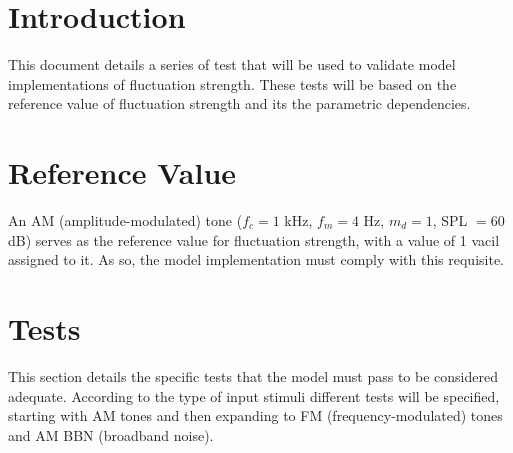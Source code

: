 \documentclass[a4paper]{article}
\begin{document}

\section{Introduction}

This document details a series of test that will be used to validate model
implementations of fluctuation strength. These tests will be based on the
reference value of fluctuation strength and its the parametric dependencies.

\section{Reference Value}

An AM (amplitude-modulated) tone ($f_c = 1$ kHz, $f_m = 4$ Hz, $m_d = 1$,
SPL $=60$ dB) serves as the reference value for fluctuation strength, with a
value of 1 vacil assigned to it. As so, the model implementation must comply
with this requisite.

\section{Tests}

This section details the specific tests that the model must pass to be
considered adequate. According to the type of input stimuli different tests
will be specified, starting with AM tones and then expanding to FM
(frequency-modulated) tones and AM BBN (broadband noise).



\end{document}
